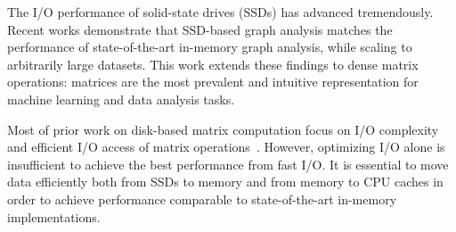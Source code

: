 

The I/O performance of solid-state drives (SSDs) has advanced tremendously.
Recent works \cite{flashgraph, gridgraph} demonstrate that SSD-based 
graph analysis matches the performance of state-of-the-art in-memory graph
analysis, while scaling to arbitrarily large datasets. This work extends
these findings to dense matrix operations: matrices are the most prevalent
and intuitive representation for machine learning and data analysis tasks.





Most of prior work on disk-based matrix computation focus on I/O complexity
and efficient I/O access of matrix operations~\cite{Toledo99, Quintana-Orti12}.
However, optimizing I/O alone is insufficient to achieve the best performance
from fast I/O. It is essential to move data efficiently both from
SSDs to memory and from memory to CPU caches in order to achieve performance
comparable to state-of-the-art in-memory implementations. 


